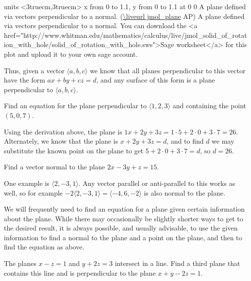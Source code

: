 \figure
\texonly
\vbox{\beginpicture
\normalgraphs
\ninepoint
\setcoordinatesystem units <3truecm,3truecm>
\setplotarea x from 0 to 1.1, y from 0 to 1.1
 at 0 0
\endpicture}
\begincaption
A plane defined via vectors perpendicular to a normal.
(\expandafter\url\expandafter{\liveurl jmol_plane}%
AP\endurl)
\endcaption
\endtexonly
{}
\htmlonly
\begincaption
A plane defined via vectors perpendicular to a normal.  You can
download the 
<a href="http://www.whitman.edu/mathematics/calculus/live/jmol_solid_of_rotation_with_hole/solid_of_rotation_with_hole.sws">Sage
worksheet</a> for this plot and upload it to your own sage account.
\endcaption
\endhtmlonly
\endfigure

Thus, given a vector $\langle a,b,c\rangle$ we know that all planes
perpendicular to this vector have the form $ax+by+cz=d$, and any surface
of this form is a plane perpendicular to $\langle a,b,c\rangle$.

\example
Find an equation for the plane perpendicular to $\langle 1,2,3\rangle$
and containing the point $(5,0,7)$.

Using the derivation above, 
the plane is $1x+2y+3z=1\cdot5+2\cdot0+3\cdot7=26$. Alternately, we
know that the plane is $x+2y+3z=d$, and to find $d$ we may substitute
the known point on the plane to get $5+2\cdot0+3\cdot7=d$, so $d=26$.
\endexample

\example
Find a vector normal to the plane $2x-3y+z=15$.

One example is $\langle 2, -3,1\rangle$. Any vector parallel or
anti-parallel to this works as well, so for example
$-2\langle 2, -3,1\rangle=\langle -4,6,-2\rangle$ is also normal to the plane.
\endexample

We will frequently need to find an equation for a plane given certain
information about the plane. While there may occasionally be slightly
shorter ways to get to the desired result, it is always possible, and
usually advisable, to use the given information to find a normal to
the plane and a point on the plane, and then to find the equation as
above. 

\example The planes $x-z=1$ and $y+2z=3$ intersect in a line. Find a
third plane that contains this line and is perpendicular to the plane
$x+y-2z=1$. 

